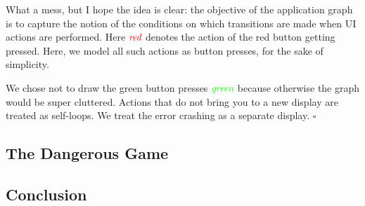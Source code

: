 \documentclass[12pt]{article}
\begin{document}
\begin{example}[Simple UI]
\begin{center}
\end{center}

What a mess, but I hope the idea is clear: the objective of the application
graph is to capture the notion of the conditions on which transitions are
made when UI actions are performed.
Here ${\color{red} \textit{red}}$ denotes the action of the red button getting pressed.
Here, we model all such actions as button presses, for the sake of simplicity.

We chose not to draw the green button presses ${\color{green} \textit{green}}$ because otherwise
the graph would be super cluttered.
Actions that do not bring you to a new display are treated as self-loops.
We treat the error crashing as a separate display.
$\square$
\end{example}


\subsection{The Dangerous Game}



\subsection{Conclusion}


\printbibliography
\end{document}
